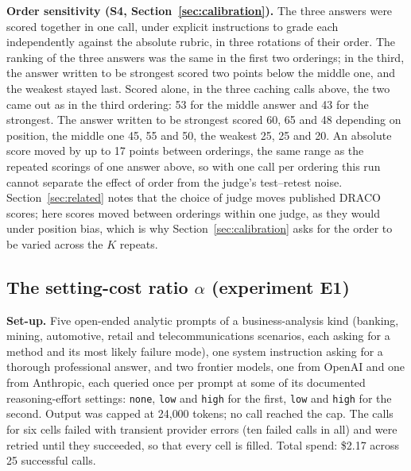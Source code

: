 \documentclass[11pt]{article}
\begin{document}
\textbf{Order sensitivity (S4, Section~\ref{sec:calibration}).} The three answers were
scored together in one call, under explicit instructions to grade each independently
against the absolute rubric, in three rotations of their order. The ranking of the three
answers was the same in the first two orderings; in the third, the answer written to be strongest scored two points below the middle one, and the weakest stayed last. Scored alone, in the three caching calls above, the two came out as in the third ordering: 53 for the middle answer and 43 for the strongest. The
answer written to be strongest scored 60, 65 and 48 depending on position, the middle one 45, 55 and 50,
the weakest 25, 25 and 20. An absolute score moved by up to 17 points between orderings, the same range as the repeated scorings of one answer above, so with one call per ordering this run cannot separate the effect of order from the judge's test--retest noise. Section~\ref{sec:related} notes that the choice of judge moves published DRACO scores; here scores moved between orderings within one judge, as they would under position bias, which is why Section~\ref{sec:calibration} asks for the order to be varied across the $K$ repeats.

\subsection{The setting-cost ratio \texorpdfstring{$\alpha$}{alpha} (experiment E1)}
\label{app:e1-alpha}

\textbf{Set-up.} Five open-ended analytic prompts of a business-analysis kind
(banking, mining, automotive, retail and telecommunications scenarios, each asking for a
method and its most likely failure mode), one system instruction asking for a thorough
professional answer, and two frontier models, one from OpenAI and one from Anthropic, each queried once per prompt at some of its documented reasoning-effort
settings: \texttt{none}, \texttt{low} and \texttt{high} for the first, \texttt{low} and
\texttt{high} for the second. Output was capped at 24{,}000 tokens; no call reached the
cap. The calls for six cells failed with transient provider errors (ten failed calls in all) and were retried until they succeeded, so that every cell is filled. Total spend: \$2.17 across 25 successful calls.
\end{document}
